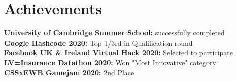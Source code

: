 \documentclass[a4paper,11pt]{article}
\begin{document}
\section{Achievements}
  \textbf{University of Cambridge Summer School:}{ successfully completed} \\
  \textbf{Google Hashcode 2020:} {Top 1/3rd in Qualification round} \\
  \textbf{Facebook UK \& Ireland Virtual Hack 2020:} {Selected to participate} \\
  \textbf{LV=Insurance Datathon 2020:} {Won "Most Innovative" category} \\
  \textbf{CSSxEWB Gamejam 2020:} {2nd Place} \\

\bigskip
\end{document}
